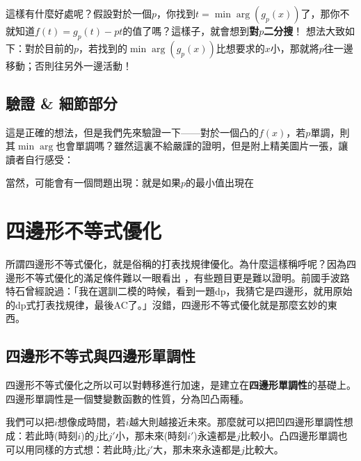 		這樣有什麼好處呢？假設對於一個$p$，你找到$t = \min \arg(g_p(x))$了，那你不就知道$f(t) = g_p(t) - pt$的值了嗎？這樣子，就會想到\textbf{對$p$二分搜}！
			想法大致如下：對於目前的$p$，若找到的$\min\arg(g_p(x))$比想要求的$x$小，那就將$p$往一邊移動；否則往另外一邊活動！
	\subsection{驗證 \& 細節部分}
		這是正確的想法，但是我們先來驗證一下——對於一個凸的$f(x)$，若$p$單調，則其$\min\arg$也會單調嗎？雖然這裏不給嚴謹的證明，但是附上精美圖片一張，讓讀者自行感受：
		\begin{center}
		\end{center}
		當然，可能會有一個問題出現：就是如果$p$的最小值出現在
	\section{四邊形不等式優化}
	
	所謂四邊形不等式優化，就是俗稱的打表找規律優化。為什麼這樣稱呼呢？因為四邊形不等式優化的滿足條件難以一眼看出  ，有些題目更是難以證明。前國手波路特石曾經說過：「我在選訓二模的時候，看到一題dp，我猜它是四邊形，就用原始的dp式打表找規律，最後AC了。」沒錯，四邊形不等式優化就是那麼玄妙的東西。
	
	\subsection{四邊形不等式與四邊形單調性}
	
	四邊形不等式優化之所以可以對轉移進行加速，是建立在\textbf{四邊形單調性}的基礎上。四邊形單調性是一個雙變數函數的性質，分為凹凸兩種。\\
	
	
	我們可以把$i$想像成時間，若$i$越大則越接近未來。那麼就可以把凹四邊形單調性想成：若此時(時刻$i$)的$j$比$j'$小，那未來(時刻$i'$)永遠都是$j$比較小。凸四邊形單調也可以用同樣的方式想：若此時$j$比$j'$大，那未來永遠都是$j$比較大。\\
	
